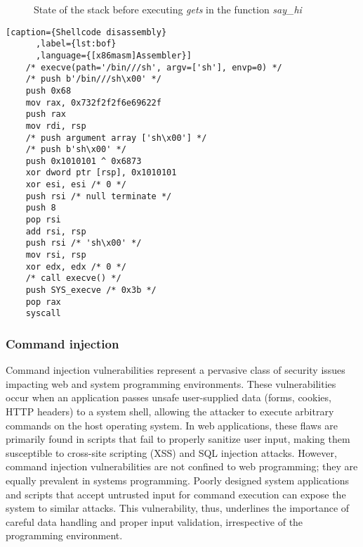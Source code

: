 \documentclass{article}
\begin{document}
\begin{figure}[ht]
  \caption{\label{fig:label} State of the stack before executing \emph{gets} in the function \emph{say\_hi}}%
  \label{fig:stackframe}
\end{figure}

\begin{lstlisting}[caption={Shellcode disassembly}
      ,label={lst:bof}
      ,language={[x86masm]Assembler}]
    /* execve(path='/bin///sh', argv=['sh'], envp=0) */
    /* push b'/bin///sh\x00' */
    push 0x68
    mov rax, 0x732f2f2f6e69622f
    push rax
    mov rdi, rsp
    /* push argument array ['sh\x00'] */
    /* push b'sh\x00' */
    push 0x1010101 ^ 0x6873
    xor dword ptr [rsp], 0x1010101
    xor esi, esi /* 0 */
    push rsi /* null terminate */
    push 8
    pop rsi
    add rsi, rsp
    push rsi /* 'sh\x00' */
    mov rsi, rsp
    xor edx, edx /* 0 */
    /* call execve() */
    push SYS_execve /* 0x3b */
    pop rax
    syscall
\end{lstlisting}

\subsubsection{Command injection}
Command injection vulnerabilities represent a pervasive class of security issues impacting web and system programming environments. These vulnerabilities occur when an application passes unsafe user-supplied data (forms, cookies, HTTP headers) to a system shell, allowing the attacker to execute arbitrary commands on the host operating system. In web applications, these flaws are primarily found in scripts that fail to properly sanitize user input, making them susceptible to cross-site scripting (XSS) and SQL injection attacks. However, command injection vulnerabilities are not confined to web programming; they are equally prevalent in systems programming. Poorly designed system applications and scripts that accept untrusted input for command execution can expose the system to similar attacks. This vulnerability, thus, underlines the importance of careful data handling and proper input validation, irrespective of the programming environment.
\end{document}
